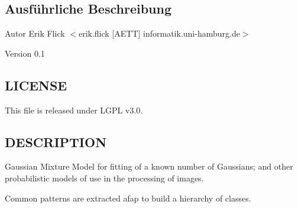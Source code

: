 \subsection{Ausführliche Beschreibung}
\begin{DoxyAuthor}{Autor}
Erik Flick $<$erik.flick \mbox{[}AETT\mbox{]} informatik.uni-\/hamburg.de$>$ 
\end{DoxyAuthor}
\begin{DoxyVersion}{Version}
0.1
\end{DoxyVersion}
\hypertarget{ProbabilisticClustering_8h_09_09_LICENSE}{}\subsection{LICENSE}\label{ProbabilisticClustering_8h_09_09_LICENSE}
This file is released under LGPL v3.0.\hypertarget{ProbabilisticClustering_8h_09_09_DESCRIPTION}{}\subsection{DESCRIPTION}\label{ProbabilisticClustering_8h_09_09_DESCRIPTION}
Gaussian Mixture Model for fitting of a known number of Gaussians; and other probabilistic models of use in the processing of images.

Common patterns are extracted afap to build a hierarchy of classes. 